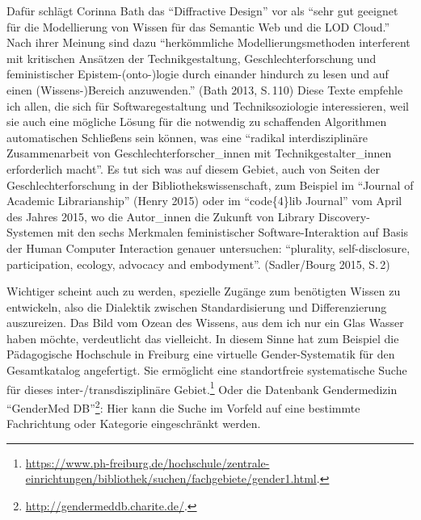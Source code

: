 Dafür schlägt Corinna Bath das \enquote{Diffractive Design} vor als
\enquote{sehr gut geeignet für die Modellierung von Wissen für das
Semantic Web und die LOD Cloud.} Nach ihrer Meinung sind dazu
\enquote{herkömmliche Modellierungsmethoden interferent mit kritischen
Ansätzen der Technikgestaltung, Geschlechterforschung und feministischer
Epistem-(onto-)logie durch einander hindurch zu lesen und auf einen
(Wissens-)Bereich anzuwenden.} (Bath 2013, S.\,110) Diese Texte empfehle
ich allen, die sich für Softwaregestaltung und Techniksoziologie
interessieren, weil sie auch eine mögliche Lösung für die notwendig zu
schaffenden Algorithmen automatischen Schließens sein können, was eine
\enquote{radikal interdisziplinäre Zusammenarbeit von
Geschlechterforscher\_innen mit Technikgestalter\_innen erforderlich
macht}. Es tut sich was auf diesem Gebiet, auch von Seiten der
Geschlechterforschung in der Bibliothekswissenschaft, zum Beispiel im
\enquote{Journal of Academic Librarianship} (Henry 2015) oder im
\enquote{code\{4\}lib Journal} vom April des Jahres 2015, wo die
Autor\_innen die Zukunft von Library Discovery-Systemen mit den sechs
Merkmalen feministischer Software-Interaktion auf Basis der Human
Computer Interaction genauer untersuchen: \enquote{plurality,
self-disclosure, participation, ecology, advocacy and embodyment}.
(Sadler/Bourg 2015, S.\,2)

Wichtiger scheint auch zu werden, spezielle Zugänge zum benötigten
Wissen zu entwickeln, also die Dialektik zwischen Standardisierung und
Differenzierung auszureizen. Das Bild vom Ozean des Wissens, aus dem ich
nur ein Glas Wasser haben möchte, verdeutlicht das vielleicht. In diesem
Sinne hat zum Beispiel die Pädagogische Hochschule in Freiburg eine
virtuelle Gender-Systematik für den Gesamtkatalog angefertigt. Sie
ermöglicht eine standortfreie systematische Suche für dieses
inter-/transdisziplinäre Gebiet.\footnote{\url{https://www.ph-freiburg.de/hochschule/zentrale-einrichtungen/bibliothek/suchen/fachgebiete/gender1.html}.}
Oder die Datenbank Gendermedizin \enquote{GenderMed DB}\footnote{\url{http://gendermeddb.charite.de/}.}:
Hier kann die Suche im Vorfeld auf eine bestimmte Fachrichtung oder
Kategorie eingeschränkt werden.

